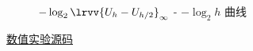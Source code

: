 \documentclass[UTF8, a4paper, 12pt, oneside, onecolumn]{article}
\begin{document}

\begin{figure}[H]\centering
	\resizebox{0.9\linewidth}{!}{}
	\caption{$-\log_2\lrvv{U_h - U_{h / 2}}_\infty$ - $-\log_2 h$ 曲线}\label{fig:log2UhUh2infty}
\end{figure}


\begin{appendices}

\href{https://github.com/Quejiahao/NumericalSolutionOfPartialDifferentialEquations.jl}{数值实验源码}

\end{appendices}
\end{document}
